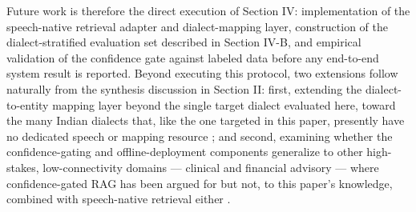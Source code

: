 \documentclass[conference]{IEEEtran}
\begin{document}
Future work is therefore the direct execution of Section IV: implementation of the speech-native retrieval adapter and dialect-mapping layer, construction of the dialect-stratified evaluation set described in Section IV-B, and empirical validation of the confidence gate against labeled data before any end-to-end system result is reported. Beyond executing this protocol, two extensions follow naturally from the synthesis discussion in Section II: first, extending the dialect-to-entity mapping layer beyond the single target dialect evaluated here, toward the many Indian dialects that, like the one targeted in this paper, presently have no dedicated speech or mapping resource \cite{dialectmatters2026,singh2023respin}; and second, examining whether the confidence-gating and offline-deployment components generalize to other high-stakes, low-connectivity domains --- clinical and financial advisory --- where confidence-gated RAG has been argued for but not, to this paper's knowledge, combined with speech-native retrieval either \cite{dependablerag2026,abstinence2025}.







\end{document}
